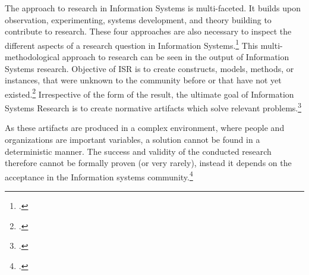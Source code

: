 The approach to research in Information Systems is multi-faceted. It builds upon observation, experimenting, systems development, and theory building to contribute to research. These four approaches are also necessary to inspect the different aspects of a research question in Information Systems.\footcite[Cf.][p.86]{NunamakerSystemsdevelopmentInformation1991} This multi-methodological approach to research can be seen in the output of Information Systems research. Objective of ISR is to create constructs, models, methods, or instances, that were unknown to the community before or that have not yet existed.\footcites[Cf.][p.12]{OsterleGestaltungsorientierteWirtschaftsinformatikPladoyer2010}[cf.][p.130]{ThomasBekannteundweniger2014} 
Irrespective of the form of the result, the ultimate goal of Information Systems Research is to create normative artifacts which solve relevant problems.\footcite[Cf.][p.130]{ThomasBekannteundweniger2014}

As these artifacts are produced in a complex environment, where people and organizations are important variables, a solution cannot be found in a deterministic manner. The success and validity of the conducted research therefore cannot be formally proven (or very rarely), instead it depends on the acceptance in the Information systems community.\footcite[Cf.][p.671]{OsterleMemorandumzurgestaltungsorientierten2010}

